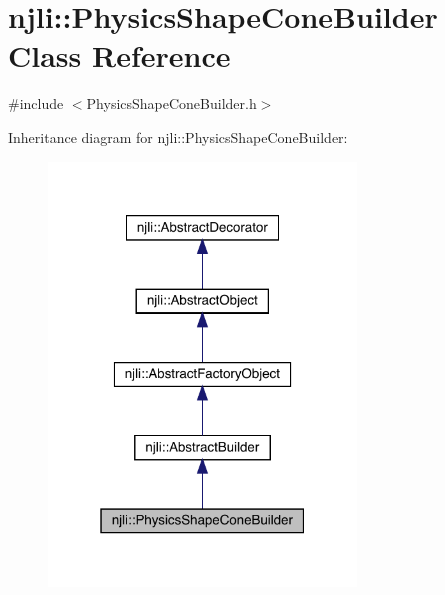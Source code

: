 \hypertarget{classnjli_1_1_physics_shape_cone_builder}{}\section{njli\+:\+:Physics\+Shape\+Cone\+Builder Class Reference}
\label{classnjli_1_1_physics_shape_cone_builder}


{\ttfamily \#include $<$Physics\+Shape\+Cone\+Builder.\+h$>$}



Inheritance diagram for njli\+:\+:Physics\+Shape\+Cone\+Builder\+:\nopagebreak
\begin{figure}[H]
\begin{center}
\leavevmode
\includegraphics[width=232pt]{classnjli_1_1_physics_shape_cone_builder__inherit__graph}
\end{center}
\end{figure}


